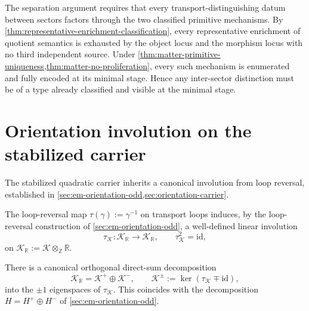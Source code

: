 \begin{remark}
\label{rem:spectral-two-locus-role}
The separation argument requires that every transport-distinguishing
datum between sectors factors through the two classified primitive
mechanisms.
By \cref{thm:representative-enrichment-classification}, every
representative enrichment of quotient semantics is exhausted by the
object locus and the morphism locus with no third independent source.
Under \cref{thm:matter-primitive-uniqueness,thm:matter-no-proliferation},
every such mechanism is enumerated and fully encoded at its minimal stage.
Hence any inter-sector distinction must be of a type already classified
and visible at the minimal stage.
\end{remark}

\section{Orientation involution on the stabilized carrier}
\label{sec:spectral-orientation}

The stabilized quadratic carrier inherits a canonical involution from
loop reversal, established in
\cref{sec:em-orientation-odd,sec:orientation-carrier}.

\begin{definition}
\label{def:spectral-orientation-involution}
The loop-reversal map $\tau(\gamma):=\gamma^{-1}$ on transport loops
induces, by the loop-reversal construction of
\cref{sec:em-orientation-odd},
a well-defined linear involution
\[
  \tau_{\mathcal K} : \mathcal K_{\mathbb R} \to \mathcal K_{\mathbb R},
  \qquad
  \tau_{\mathcal K}^2 = \mathrm{id},
\]
on $\mathcal K_{\mathbb R} := \mathcal K \otimes_{\mathbb Z} \mathbb R$.
\end{definition}

\begin{proposition}
\label{prop:spectral-orientation-decomp}
There is a canonical orthogonal direct-sum decomposition
\[
  \mathcal K_{\mathbb R} = \mathcal K^+ \oplus \mathcal K^-,
  \qquad
  \mathcal K^\pm := \ker(\tau_{\mathcal K} \mp \mathrm{id}),
\]
into the $\pm 1$ eigenspaces of $\tau_{\mathcal K}$.
This coincides with the decomposition $H = H^+ \oplus H^-$ of
\cref{sec:em-orientation-odd}.
\end{proposition}

